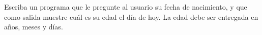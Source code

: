 Escriba un programa que le pregunte al usuario su fecha de nacimiento,
y que como salida muestre cuál es su edad el día de hoy.
La edad debe ser entregada en años, meses y días.


